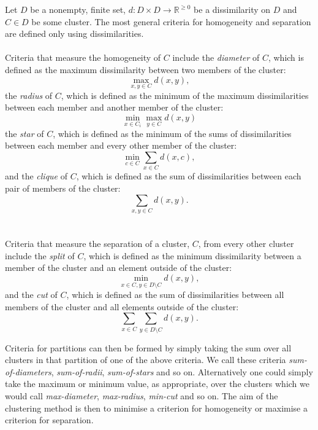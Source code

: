 \documentclass[a4paper]{report}
\newcommand{\dset}{D}
\begin{document}
Let $\dset$ be a nonempty, finite set, $d \colon \dset \times \dset \to
\mathbb{R}^{\geq 0}$ be a dissimilarity on $\dset$ and $C \in \dset$ be some
cluster.  The most general criteria for homogeneity and separation are defined
only using dissimilarities.
\\\\
\noindent Criteria that measure the homogeneity of $C$ include the
\textit{diameter} of $C$, which is defined as the maximum dissimilarity
between two members of the cluster:
\begin{equation*}
  \max_{x,y \in C} d(x,y),
\end{equation*}
the \textit{radius} of $C$, which is defined as the minimum of the maximum
dissimilarities between each member and another member of the cluster:
\begin{equation*}
  \min_{x \in C_i} \max_{y \in C} d(x,y)
\end{equation*}
the \textit{star} of $C$, which is defined as the minimum of the sums of
dissimilarities between each member and every other member of the cluster:
\begin{equation*}
  \min_{c \in C} \sum_{x \in C} d(x,c),
\end{equation*}
and the \textit{clique} of $C$, which is defined as the sum of dissimilarities
between each pair of members of the cluster:
\begin{equation*}
  \sum_{x,y \in C} d(x,y).
\end{equation*}
\\\\
\noindent Criteria that measure the separation of a cluster, $C$, from every
other cluster include the \textit{split} of $C$, which is defined as the
minimum dissimilarity between a member of the cluster and an element outside
of the cluster:
\begin{equation*}
  \min_{x \in C, y \in \dset \setminus C} d(x,y),
\end{equation*}
and the \textit{cut} of $C$, which is defined as the sum of dissimilarities
between all members of the cluster and all elements outside of the cluster:
\begin{equation*}
  \sum_{x \in C} \sum_{y \in \dset \setminus C} d(x,y).
\end{equation*}

Criteria for partitions can then be formed by simply taking the sum over all
clusters in that partition of one of the above criteria.  We call these
criteria \textit{sum-of-diameters}, \textit{sum-of-radii},
\textit{sum-of-stars} and so on.  Alternatively one could simply take the
maximum or minimum value, as appropriate, over the clusters which we would
call \textit{max-diameter}, \textit{max-radius}, \textit{min-cut} and so on.
The aim of the clustering method is then to minimise a criterion for
homogeneity or maximise a criterion for separation.
\end{document}
